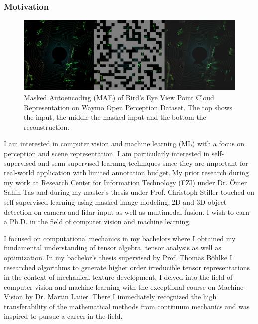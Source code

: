 


\setlength{\columnsep}{15pt}%
\setlength{\intextsep}{0pt plus 0pt minus 0pt}


\setlength{\parindent}{\myindent}

 \vspace*{-10pt}

\subsubsection{Motivation}
\begin{figure}
    \includegraphics[width=420pt, angle=270]{pic/Hiera-Waymo.png}
    \mainfont\fontsize{9pt}{9pt}\selectfont\caption{ \mainfont\fontsize{9pt}{9pt}\selectfont Masked Autoencoding 
    (MAE) of Bird's Eye View Point Cloud Representation on Waymo Open Perception Dataset. The top shows the input, the middle the masked input and the bottom the 
    reconstruction.}
    \label{fig:mae_img}
    \end{figure}
    I am interested in computer vision and machine learning (ML) with a focus on perception and scene representation. I am particularly interested in self-supervised and semi-supervised learning techniques since they are important for real-world application with limited annotation budget. My prior research during my work at Research Center for Information Technology (FZI) under Dr. Ömer Sahin Tas and during my master’s thesis under Prof. Christoph Stiller touched on self-supervised learning using masked image modeling, 2D and 3D object detection on camera and lidar input as well as multimodal fusion. I wish to earn a Ph.D. in the field of computer vision and machine learning.

    I focused on computational mechanics in my bachelors where I obtained my fundamental understanding of tensor algebra, tensor analysis as well as optimization. In my bachelor’s thesis supervised by Prof. Thomas Böhlke I researched algorithms to generate higher order irreducible tensor representations in the context of mechanical texture development. I delved into the field of computer vision and machine learning with the exceptional course on Machine Vision by Dr. Martin Lauer. There I immediately recognized the high transferability of the mathematical methods from continuum mechanics and was inspired to pursue a career in the field.

